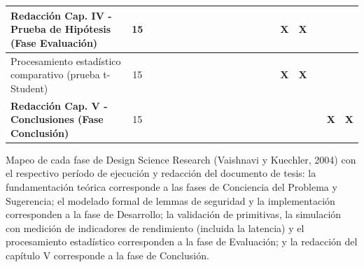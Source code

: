\begin{table}[H]
\begin{tabular}{|p{4.4cm}|c|c|c|c|c|c|c|c|c|c|c|c|c|c|c|c|c|c|c|}
		\hline
		\textbf{Redacción Cap. IV - Prueba de Hipótesis (Fase Evaluación)} & 15 & & & & & & & & & & & & & & \textbf{X} & \textbf{X} & & & \\
		\hline
		\quad Procesamiento estadístico comparativo (prueba t-Student) & 15 & & & & & & & & & & & & & & \textbf{X} & \textbf{X} & & & \\
		\hline
		\textbf{Redacción Cap. V - Conclusiones (Fase Conclusión)} & 15 & & & & & & & & & & & & & & & & & \textbf{X} & \textbf{X} \\
		\hline
	\end{tabular}
	\par{}
\end{table}
Mapeo de cada fase de Design Science Research (Vaishnavi y Kuechler, 2004) con el respectivo período de ejecución y redacción del documento de tesis: la fundamentación teórica corresponde a las fases de Conciencia del Problema y Sugerencia; el modelado formal de lemmas de seguridad y la implementación corresponden a la fase de Desarrollo; la validación de primitivas, la simulación con medición de indicadores de rendimiento (incluida la latencia) y el procesamiento estadístico corresponden a la fase de Evaluación; y la redacción del capítulo V corresponde a la fase de Conclusión.